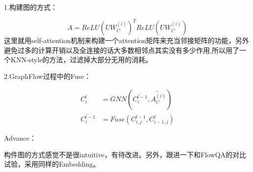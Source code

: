 \documentclass[a4paper,UTF8]{article}
\numberwithin{equation}{section}
\begin{document}
1.构建图的方式：

$$ A=ReLU(UW_C^{(i)})^TReLU(UW_C^{(i)}) $$
这里就用self-attention机制来构建一个attention矩阵来充当邻接矩阵的功能，另外避免过多的计算开销以及全连接的话大多数相邻点其实没有多少作用,所以用了一个KNN-style的方法，过滤掉大部分无用的消耗。

2.GraphFlow过程中的Fuse：

\begin{align*}
	C_i^l &= GNN(\overline{C_i^{l-1}},\widetilde{A_C^{(i)}})\\
	\overline{C_i^{l-1}} &= Fuse(C_{i,j}^{l-1},C_{i-1,j}^{l})
\end{align*}

Advance：

构件图的方式感觉不是很intuitive，有待改进。另外，跟进一下和FlowQA的对比试验，采用同样的Embedding。
\end{document}
